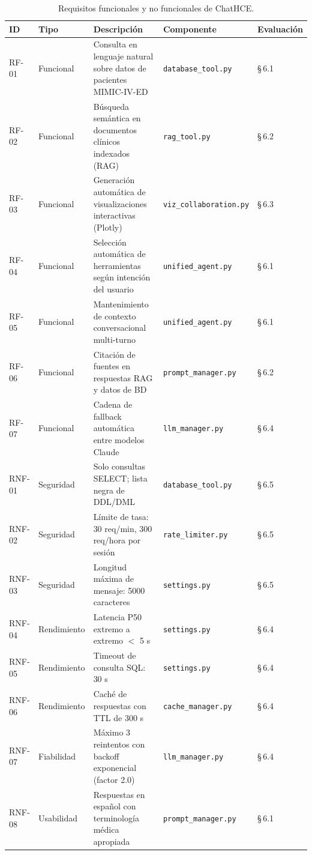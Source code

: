 \begin{table}[t]
\centering
\caption{Requisitos funcionales y no funcionales de ChatHCE.}
\label{tab:requisitos}
\footnotesize
\begin{tabularx}{\textwidth}{llXll}
\toprule
\textbf{ID} & \textbf{Tipo} & \textbf{Descripción} & \textbf{Componente} & \textbf{Evaluación} \\
\midrule
RF-01 & Funcional & Consulta en lenguaje natural sobre datos de pacientes MIMIC-IV-ED & \texttt{database\_tool.py} & \S\,6.1 \\
RF-02 & Funcional & Búsqueda semántica en documentos clínicos indexados (RAG) & \texttt{rag\_tool.py} & \S\,6.2 \\
RF-03 & Funcional & Generación automática de visualizaciones interactivas (Plotly) & \texttt{viz\_collaboration.py} & \S\,6.3 \\
RF-04 & Funcional & Selección automática de herramientas según intención del usuario & \texttt{unified\_agent.py} & \S\,6.1 \\
RF-05 & Funcional & Mantenimiento de contexto conversacional multi-turno & \texttt{unified\_agent.py} & \S\,6.1 \\
RF-06 & Funcional & Citación de fuentes en respuestas RAG y datos de BD & \texttt{prompt\_manager.py} & \S\,6.2 \\
RF-07 & Funcional & Cadena de fallback automática entre modelos Claude & \texttt{llm\_manager.py} & \S\,6.4 \\
\midrule
RNF-01 & Seguridad & Solo consultas SELECT; lista negra de DDL/DML & \texttt{database\_tool.py} & \S\,6.5 \\
RNF-02 & Seguridad & Límite de tasa: 30 req/min, 300 req/hora por sesión & \texttt{rate\_limiter.py} & \S\,6.5 \\
RNF-03 & Seguridad & Longitud máxima de mensaje: 5000 caracteres & \texttt{settings.py} & \S\,6.5 \\
RNF-04 & Rendimiento & Latencia P50 extremo a extremo $<$ 5 s & \texttt{settings.py} & \S\,6.4 \\
RNF-05 & Rendimiento & Timeout de consulta SQL: 30 s & \texttt{settings.py} & \S\,6.4 \\
RNF-06 & Rendimiento & Caché de respuestas con TTL de 300 s & \texttt{cache\_manager.py} & \S\,6.4 \\
RNF-07 & Fiabilidad & Máximo 3 reintentos con backoff exponencial (factor 2.0) & \texttt{llm\_manager.py} & \S\,6.4 \\
RNF-08 & Usabilidad & Respuestas en español con terminología médica apropiada & \texttt{prompt\_manager.py} & \S\,6.1 \\
\bottomrule
\end{tabularx}
\end{table}

